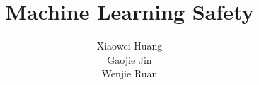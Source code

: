 \documentclass[graybox,envcountchap,sectrefs]{svmono}
\begin{document}
\title{Machine Learning Safety}
%
%
\author{Xiaowei Huang %
\\
Gaojie Jin\\
Wenjie Ruan
}

\maketitle

\frontmatter%

%
%

%

\tableofcontents




\mainmatter%






%



























\backmatter%

%
\printindex



\end{document}
